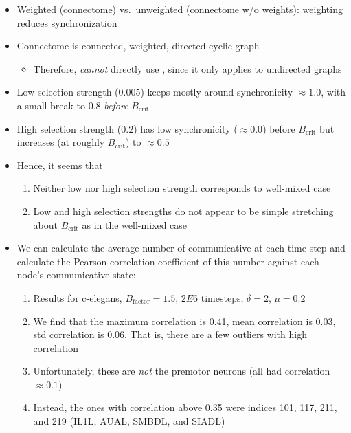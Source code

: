 \documentclass[pdflatex,lineno,referee,sn-mathphys-ay]{class/sn-jnl}
\begin{document}
\begin{itemize}
  \item Weighted (connectome) vs.\ unweighted (connectome w/o
    weights): weighting reduces synchronization
  \item Connectome is connected, weighted, directed cyclic graph
  \begin{itemize}
    \item Therefore, \emph{cannot} directly use
      \cite{allen2017evolutionary}, since it only applies to undirected
      graphs
  \end{itemize}
  \item Low selection strength ($0.005$) keeps mostly around synchronicity
    $\approx 1.0$, with a small break to 0.8 \emph{before} $B_{\text{crit}}$
  \item High selection strength ($0.2$) has low synchronicity
    ($\approx 0.0$) before $B_{\text{crit}}$ but increases (at roughly
    $B_{\text{crit}}$) to $\approx 0.5$
  \item Hence, it seems that
  \begin{enumerate}
    \item Neither low nor high selection strength corresponds to
      well-mixed case
    \item Low and high selection strengths do not appear to be simple
      stretching about $B_{\text{crit}}$ as in the well-mixed case
  \end{enumerate}
  \item We can calculate the average number of communicative at each
    time step and calculate the Pearson correlation coefficient of
    this number against each node's communicative state:
  \begin{enumerate}
    \item Results for c-elegans, $B_{\text{factor}} = 1.5$, $2E6$ timesteps,
      $\delta = 2$, $\mu = 0.2$
    \item We find that the maximum correlation is \num{0.41}, mean
      correlation is \num{0.03}, std correlation is \num{0.06}. That
      is, there are a few outliers with high correlation
    \item Unfortunately, these are \emph{not} the premotor neurons
      (all had correlation $\approx \num{0.1}$)
    \item Instead, the ones with correlation above \num{0.35} were
      indices 101, 117, 211, and 219 (IL1L, AUAL, SMBDL, and SIADL)
  \end{enumerate}
\end{itemize}
\end{document}
